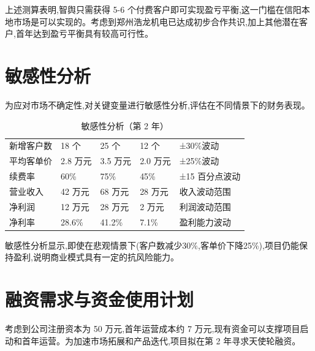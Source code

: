 上述测算表明,智舆只需获得 5-6 个付费客户即可实现盈亏平衡,这一门槛在信阳本地市场是可以实现的。考虑到郑州浩龙机电已达成初步合作共识,加上其他潜在客户,首年达到盈亏平衡具有较高可行性。

\section{敏感性分析}

为应对市场不确定性,对关键变量进行敏感性分析,评估在不同情景下的财务表现。

\begin{table}[htbp]
	\centering
	\caption{敏感性分析（第 2 年）}
	\begin{tabularx}{\textwidth}{L{3.5cm}C{2.2cm}C{2.2cm}C{2.2cm}Y}
		\toprule
		 &  &  &  &  \\
		\midrule
		新增客户数        & 18 个           & 25 个           & 12 个           & ±30\%波动      \\
		平均客单价        & 2.8 万元         & 3.5 万元         & 2.0 万元         & ±25\%波动      \\
		续费率          & 60\%           & 75\%           & 45\%           & ±15 百分点波动    \\
		\midrule
		营业收入         & 42 万元          & 68 万元          & 28 万元          & 收入波动范围       \\
		净利润          & 12 万元          & 28 万元          & 2 万元           & 利润波动范围       \\
		净利率          & 28.6\%         & 41.2\%         & 7.1\%          & 盈利能力波动       \\
		\bottomrule
	\end{tabularx}
\end{table}

敏感性分析显示,即使在悲观情景下(客户数减少30\%,客单价下降25\%),项目仍能保持盈利,说明商业模式具有一定的抗风险能力。

\section{融资需求与资金使用计划}

考虑到公司注册资本为 50 万元,首年运营成本约 7 万元,现有资金可以支撑项目启动和首年运营。为加速市场拓展和产品迭代,项目拟在第 2 年寻求天使轮融资。


